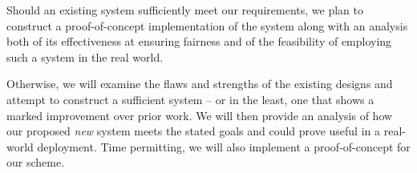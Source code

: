 \documentclass[twocolumn]{article}
\begin{document}
		Should an existing system sufficiently meet our requirements, we plan to construct a
		proof-of-concept implementation of the system along with an analysis both of its effectiveness
		at ensuring fairness and of the feasibility of employing such a system in the real world.

		Otherwise, we will examine the flaws and strengths of the existing designs and attempt to
		construct a sufficient system -- or in the least, one that shows a marked improvement over
		prior work. We will then provide an analysis of how our proposed \emph{new} system meets the
		stated goals and could prove useful in a real-world deployment. Time permitting, we will also
		implement a proof-of-concept for our scheme.

	{}
	
\end{document}
